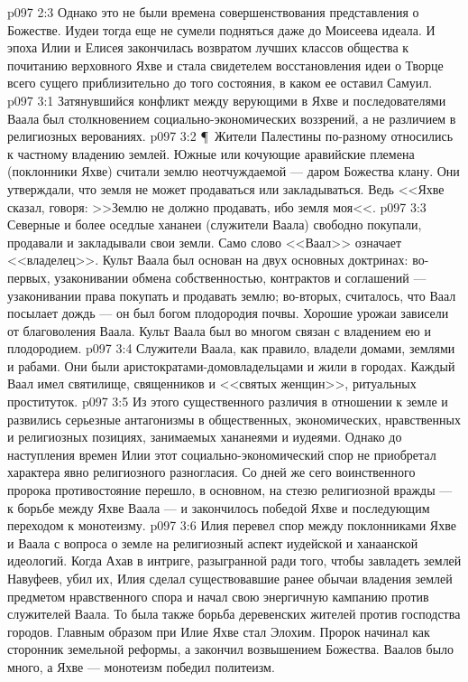 \vs p097 2:3 Однако это не были времена совершенствования представления о Божестве. Иудеи тогда еще не сумели подняться даже до Моисеева идеала. И эпоха Илии и Елисея закончилась возвратом лучших классов общества к почитанию верховного Яхве и стала свидетелем восстановления идеи о Творце всего сущего приблизительно до того состояния, в каком ее оставил Самуил.
\vs p097 3:1 Затянувшийся конфликт между верующими в Яхве и последователями Ваала был столкновением социально\hyp{}экономических воззрений, а не различием в религиозных верованиях.
\vs p097 3:2 \P\ Жители Палестины по\hyp{}разному относились к частному владению землей. Южные или кочующие аравийские племена (поклонники Яхве) считали землю неотчуждаемой --- даром Божества клану. Они утверждали, что земля не может продаваться или закладываться. Ведь <<Яхве сказал, говоря: >>Землю не должно продавать, ибо земля моя<<.
\vs p097 3:3 Северные и более оседлые хананеи (служители Ваала) свободно покупали, продавали и закладывали свои земли. Само слово <<Ваал>> означает <<владелец>>. Культ Ваала был основан на двух основных доктринах: во\hyp{}первых, узаконивании обмена собственностью, контрактов и соглашений --- узаконивании права покупать и продавать землю; во\hyp{}вторых, считалось, что Ваал посылает дождь --- он был богом плодородия почвы. Хорошие урожаи зависели от благоволения Ваала. Культ Ваала был во многом связан с  владением ею и плодородием.
\vs p097 3:4 Служители Ваала, как правило, владели домами, землями и рабами. Они были аристократами\hyp{}домовладельцами и жили в городах. Каждый Ваал имел святилище, священников и <<святых женщин>>, ритуальных проституток.
\vs p097 3:5 Из этого существенного различия в отношении к земле и развились серьезные антагонизмы в общественных, экономических, нравственных и религиозных позициях, занимаемых хананеями и иудеями. Однако до наступления времен Илии этот социально\hyp{}экономический спор не приобретал характера явно религиозного разногласия. Со дней же сего воинственного пророка противостояние перешло, в основном, на стезю религиозной вражды --- к борьбе между Яхве  Ваала --- и закончилось победой Яхве и последующим переходом к монотеизму.
\vs p097 3:6 Илия перевел спор между поклонниками Яхве и Ваала с вопроса о земле на религиозный аспект иудейской и ханаанской идеологий. Когда Ахав в интриге, разыгранной ради того, чтобы завладеть землей Навуфеев, убил их, Илия сделал существовавшие ранее обычаи владения землей предметом нравственного спора и начал свою энергичную кампанию против служителей Ваала. То была также борьба деревенских жителей против господства городов. Главным образом при Илие Яхве стал Элохим. Пророк начинал как сторонник земельной реформы, а закончил возвышением Божества. Ваалов было много, а Яхве ---  монотеизм победил политеизм.
